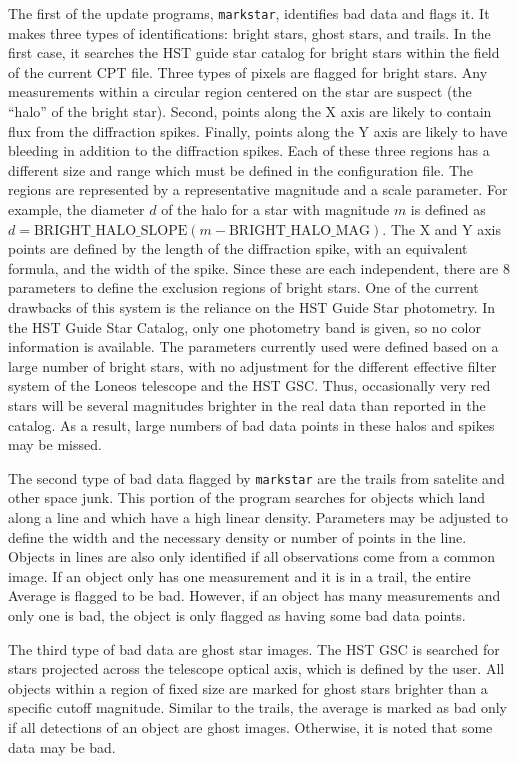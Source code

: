 \documentclass{article}
\begin{document}
The first of the update programs, {\tt markstar}, identifies bad data
and flags it.  It makes three types of identifications: bright stars,
ghost stars, and trails.  In the first case, it searches the HST guide
star catalog for bright stars within the field of the current CPT
file.  Three types of pixels are flagged for bright stars.  Any
measurements within a circular region centered on the star are suspect
(the ``halo'' of the bright star).  Second, points along the X axis
are likely to contain flux from the diffraction spikes.  Finally,
points along the Y axis are likely to have bleeding in addition to the
diffraction spikes.  Each of these three regions has a different size
and range which must be defined in the configuration file.  The
regions are represented by a representative magnitude and a scale
parameter.  For example, the diameter $d$ of the halo for a star with
magnitude $m$ is defined as 
$d = \mbox{BRIGHT\_HALO\_SLOPE} (m - \mbox{BRIGHT\_HALO\_MAG})$.  The X and
Y axis points are defined by the length of the diffraction spike, with
an equivalent formula, and the width of the spike.  Since these are
each independent, there are 8 parameters to define the exclusion
regions of bright stars.  One of the current drawbacks of this system
is the reliance on the HST Guide Star photometry.  In the HST Guide
Star Catalog, only one photometry band is given, so no color
information is available.  The parameters currently used were defined
based on a large number of bright stars, with no adjustment for the
different effective filter system of the Loneos telescope and the HST
GSC.  Thus, occasionally very red stars will be several magnitudes
brighter in the real data than reported in the catalog.  As a result,
large numbers of bad data points in these halos and spikes may be
missed.  

The second type of bad data flagged by {\tt markstar} are the trails
from satelite and other space junk.  This portion of the program
searches for objects which land along a line and which have a high
linear density.  Parameters may be adjusted to define the width and
the necessary density or number of points in the line.  Objects in
lines are also only identified if all observations come from a common
image.  If an object only has one measurement and it is in a trail,
the entire Average is flagged to be bad.  However, if an object has
many measurements and only one is bad, the object is only flagged as
having some bad data points.  

The third type of bad data are ghost star images.  The HST GSC is
searched for stars projected across the telescope optical axis, which
is defined by the user.  All objects within a region of fixed size are
marked for ghost stars brighter than a specific cutoff magnitude.
Similar to the trails, the average is marked as bad only if all
detections of an object are ghost images.  Otherwise, it is noted that
some data may be bad.
\end{document}
